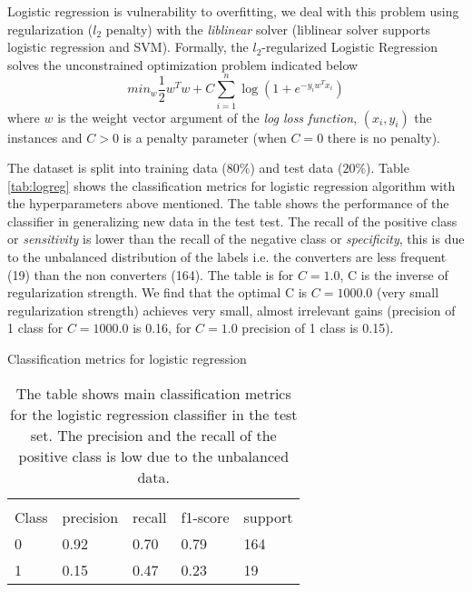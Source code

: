 \documentclass[11pt]{article}
\theoremstyle{definition}
\theoremstyle{remark}
\begin{document}
Logistic regression is vulnerability to overfitting, we deal with this problem using regularization ($l_2$ penalty) with the  \emph{liblinear} solver (liblinear solver supports logistic regression and SVM). 
Formally, the $l_2$-regularized Logistic Regression solves the unconstrained optimization problem indicated below \cite{fan2008liblinear}
\begin{equation}
\textit{min}_{w} \frac{1}{2}w^Tw + C \sum_{i=1}^{n}\log(1+ e^{-y_iw^Tx_i})
\end{equation}
where $w$ is the weight vector argument of the \emph{log loss function}, $(x_i,y_i)$ the instances and $C > 0$ is a penalty parameter (when $C=0$ there is no penalty).

The dataset is split into training data ($80\%$) and test data ($20\%$). Table \ref{tab:logreg} shows the classification metrics for logistic regression algorithm with the hyperparameters above mentioned. The table shows the performance of the classifier in generalizing new data in the test test. 
The recall of the positive class or \emph{sensitivity} is lower than the recall of the negative class or \emph{specificity}, this is due to the unbalanced distribution of the labels i.e. the converters are less frequent (19) than the non converters (164). The table is for $C = 1.0$, C is the inverse of regularization strength. We find that the optimal C is $C = 1000.0$ (very small regularization strength) achieves very small, almost irrelevant gains (precision of 1 class for $C = 1000.0$ is 0.16, for $C = 1.0$ precision of 1 class is 0.15). 

\begin{table}[H]
\caption{Classification metrics for logistic regression} \label{tab:logreg} 
\begin{center} 
\begin{tabular}{lllll}
\hline
\multicolumn{1}{c}{} \\
Class & precision & recall & f1-score & support     \\
\hline
0 & 0.92  &    0.70   &   0.79   &    164 \\
1 & 0.15  &    0.47   &   0.23   &     19 \\
\hline
\end{tabular}
\caption{The table shows main classification metrics for the logistic regression classifier in the test set. The precision and the recall of the positive class is low due to the unbalanced data.} \label{tab:logregress}
\end{center}
\end{table}
\end{document}
